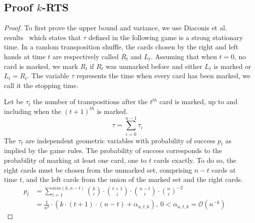 \documentclass[USenglish,oneside,twocolumn]{article}
\begin{document}
\subsection{Proof $k$-RTS}\label{proof:kRTS}
\begin{proof}
To first prove the upper bound and variance, we use Diaconis et al. results~\cite{aldous1986shuffling} which states that $\tau$ defined in the following game is a strong stationary time.
In a random transposition shuffle, the cards chosen by the right and left hands at time $t$ are respectively called $R_t$ and $L_t$. Assuming that when $t=0$, no card is marked, we mark $R_t$ if
$R_t$ was unmarked before and either $L_t$ is marked or $L_t = R_t$. The variable $\tau$ represents the time when every card has been marked, we call it the stopping time.

Let be $\tau_t$ the number of transpositions after the $t^{th}$ card is marked, up to and including when the $(t+1)^{th}$ is marked. $$\tau = \sum_{i=0}^{n-1} \tau_i$$
The $\tau_t$ are independent geometric variables with probability of success $p_t$ as implied by the game rules.
The probability of success corresponds to the probability of marking at least one card, one to $t$ cards exactly. To do so, the right cards must be chosen from the unmarked set, comprising $n-t$ cards at time $t$,
and the left cards from the union of the marked set and the right cards.
\begin{align*}
 p_t &= \sum_{i=1}^{min(k,n-t)} {k \choose i} \cdot {t+1 \choose i} \cdot {n-t \choose i}\cdot{n \choose i}^{-2}&\\
 &= \frac{1}{n^2} \cdot \left ( k \cdot (t+1)\cdot(n-t) + \alpha_{n,t,k}\right ),\ 0 < \alpha_{n,t,k} = \mathcal{O}\left(n^{-k}\right )
\end{align*}


\end{proof}
\end{document}
